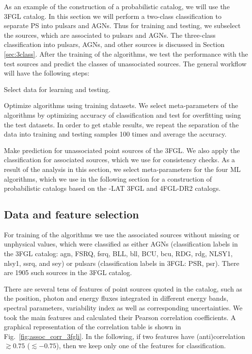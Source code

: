 As an example of the construction of a probabilistic catalog, we will use the 3FGL catalog.
In this section we will perform a two-class classification to separate PS into pulsars and AGNs.
Thus for training and testing, we subselect the sources, which are associated to pulsars and AGNs.
The three-class classification into pulsars, AGNs, and other sources is discussed in Section \ref{sec:3class}.
After the training of the algorithms, we test the performance with the test sources and predict the classes of unassociated sources.
The general workflow will have the following steps:
\ben
\item
Select data for learning and testing.
\item
Optimize algorithms using training datasets.
We select meta-parameters of the algorithms by optimizing accuracy of classification and test for overfitting using the test datasets.
In order to get stable results, we repeat the separation of the data into training and testing samples 100 times and 
average the accuracy.
\item
Make prediction for unassociated point sources of the 3FGL.
We also apply the classification for associated sources, which we use for consistency checks.
\een
As a result of the analysis in this section, we select meta-parameters for the four ML algorithms,
which we use in the following section for a construction of probabilistic catalogs
based on the \Fermi-LAT 3FGL and 4FGL-DR2 catalogs.



\subsection{Data and feature selection}

For training of the algorithms we use the associated sources without missing or unphysical values, 
which were classified as either AGNs (classification labels in the 3FGL catalog: agn, FSRQ, fsrq, BLL, bll, BCU, bcu, RDG, rdg, NLSY1, nlsy1, ssrq, and sey) or pulsars (classification labels in 3FGL: PSR, psr). 
There are 1905 such sources in the 3FGL catalog. 


There are several tens of features of point sources quoted in the catalog, such as the position, photon and energy fluxes integrated in different energy bands, spectral parameters, variability index as well as corresponding uncertainties. 
We took the main features and calculated their Pearson correlation coefficients. 
A graphical representation of the correlation table is shown in Fig.~\ref{fig:assoc_corr_3fgli}. 
In the following, if two features have (anti)correlation $\gtrsim 0.75$ 
($\lesssim -0.75$), then we keep only one of the features for classification.

